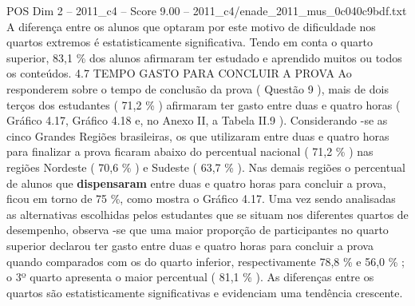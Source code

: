 \begin{textsample}{POS Dim 2 – 2011\_c4 – Score 9.00 – 2011\_c4/enade\_2011\_mus\_0c040c9bdf.txt}
A diferença entre os alunos que optaram por este motivo de dificuldade nos quartos extremos é estatisticamente significativa.
Tendo em conta o quarto superior, 83,1 \% dos alunos afirmaram ter estudado e aprendido muitos ou todos os conteúdos. 4.7 TEMPO GASTO PARA CONCLUIR A PROVA Ao responderem sobre o tempo de conclusão da prova ( Questão 9 ), mais de dois terços dos estudantes ( 71,2 \% ) afirmaram ter gasto entre duas e quatro horas ( Gráfico 4.17, Gráfico 4.18 e, no Anexo II, a Tabela II.9 ).
Considerando -se as cinco Grandes Regiões brasileiras, os que utilizaram entre duas e quatro horas para finalizar a prova ficaram abaixo do percentual nacional ( 71,2 \% ) nas regiões Nordeste ( 70,6 \% ) e Sudeste ( 63,7 \% ).
Nas demais regiões o percentual de alunos que \textbf{dispensaram} entre duas e quatro horas para concluir a prova, ficou em torno de 75 \%, como mostra o Gráfico 4.17.
Uma vez sendo analisadas as alternativas escolhidas pelos estudantes que se situam nos diferentes quartos de desempenho, observa -se que uma maior proporção de participantes no quarto superior declarou ter gasto entre duas e quatro horas para concluir a prova quando comparados com os do quarto inferior, respectivamente 78,8 \% e 56,0 \% ; o 3º quarto apresenta o maior percentual ( 81,1 \% ).
As diferenças entre os quartos são estatisticamente significativas e evidenciam uma tendência crescente.

\end{textsample}
